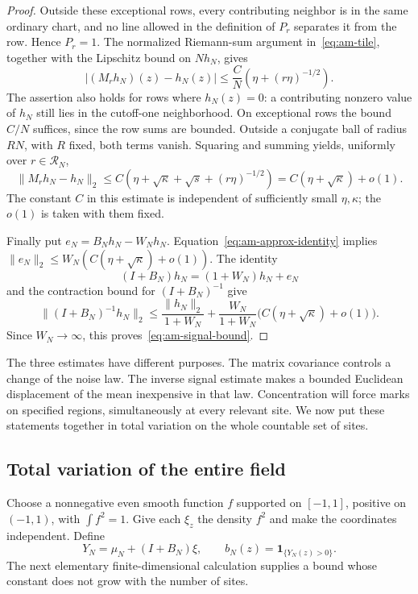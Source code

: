 \begin{proof}
Outside these exceptional rows, every contributing neighbor is in the same
ordinary chart, and no line allowed in the definition of $P_r$ separates it
from the row.  Hence $P_r=1$.  The normalized Riemann-sum argument
in~\eqref{eq:am-tile}, together with the Lipschitz bound on $Nh_N$, gives
\[
 |(M_rh_N)(z)-h_N(z)|
 \le \frac{C}{N}\left(\eta+(r\eta)^{-1/2}\right).
\]
The assertion also holds for rows where $h_N(z)=0$: a contributing nonzero
value of $h_N$ still lies in the cutoff-one neighborhood.  On exceptional
rows the bound $C/N$ suffices, since the row sums are bounded.  Outside a
conjugate ball of radius $RN$, with $R$ fixed, both terms vanish.  Squaring and summing yields,
uniformly over $r\in\mathcal R_N$,
\begin{equation}\label{eq:am-approx-identity}
 \|M_rh_N-h_N\|_2
 \le C\left(\eta+\sqrt\kappa+\sqrt{s}+(r\eta)^{-1/2}\right)
 = C(\eta+\sqrt\kappa)+o(1).
\end{equation}
The constant $C$ in this estimate is independent of sufficiently small
$\eta,\kappa$; the $o(1)$ is taken with them fixed.

Finally put $e_N=B_Nh_N-W_Nh_N$.  Equation~\eqref{eq:am-approx-identity}
implies
$\|e_N\|_2\le W_N(C(\eta+\sqrt\kappa)+o(1))$.  The identity
\[
 (I+B_N)h_N=(1+W_N)h_N+e_N
\]
and the contraction bound for $(I+B_N)^{-1}$ give
\[
 \|(I+B_N)^{-1}h_N\|_2
 \le \frac{\|h_N\|_2}{1+W_N}
   +\frac{W_N}{1+W_N}\bigl(C(\eta+\sqrt\kappa)+o(1)\bigr).
\]
Since $W_N\to\infty$, this proves~\eqref{eq:am-signal-bound}.
\end{proof}

The three estimates have different purposes.  The matrix covariance controls
a change of the noise law.  The inverse signal estimate makes a bounded
Euclidean displacement of the mean inexpensive in that law.  Concentration
will force marks on specified regions, simultaneously at every relevant
site.  We now put these statements together in total variation on the whole
countable set of sites.

\subsection{Total variation of the entire field}

Choose a nonnegative even smooth function $f$ supported on $[-1,1]$, positive
on $(-1,1)$, with $\int f^2=1$.  Give each $\xi_z$ the density $f^2$ and
make the coordinates independent.  Define
\begin{equation}\label{eq:am-field}
 Y_N=\mu_N+(I+B_N)\xi,
 \qquad b_N(z)=\mathbf1_{\{Y_N(z)>0\}}.
\end{equation}
The next elementary finite-dimensional calculation supplies a bound whose
constant does not grow with the number of sites.

